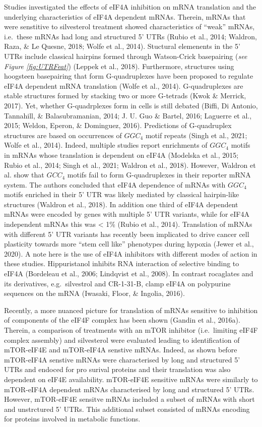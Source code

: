 \documentclass[12pt,openany]{book}
\begin{document}
Studies investigated the effects of eIF4A inhibition on mRNA translation
and the underlying characteristics of eIF4A dependent mRNAs. Therein,
mRNAs that were senstitive to silvesterol treatment showed
characteristics of ``weak'' mRNAs, i.e.~these mRNAs had long and
structured 5' UTRs (Rubio et al., 2014; Waldron, Raza, \& Le Quesne,
2018; Wolfe et al., 2014). Stuctural elemenents in the 5' UTRs include
classical hairpins formed through Watson-Crick basepairing (\emph{see
Figure \ref{fig:UTRFeat}}) (Leppek et al., 2018). Furthermore,
structures using hoogsteen basepairing that form G-quadruplexes have
been proposed to regulate eIF4A dependent mRNA translation (Wolfe et
al., 2014). G-quadruplexes are stable structures formed by stacking two
or more G-tetrads (Kwok \& Merrick, 2017). Yet, whether G-quadrplexes
form in cells is still debated (Biffi, Di Antonio, Tannahill, \&
Balasubramanian, 2014; J. U. Guo \& Bartel, 2016; Laguerre et al., 2015;
Weldon, Eperon, \& Dominguez, 2016). Predictions of G-quadruplex
structures are based on occurrences of \(GGC_4\) motif repeats (Singh et
al., 2021; Wolfe et al., 2014). Indeed, multiple studies report
enrichments of \(GGC_4\) motifs in mRNAs whose translation is dependent
on eIF4A (Modelska et al., 2015; Rubio et al., 2014; Singh et al., 2021;
Waldron et al., 2018). However, Waldron et al. show that \(GCC_4\)
motifs fail to form G-quadruplexes in their reporter mRNA system. The
authors concluded that eIF4A dependence of mRNAs with \(GGC_4\) motifs
enriched in their 5' UTR was likely mediated by classical hairpin-like
structures (Waldron et al., 2018). In addition one third of eIF4A
dependent mRNAs were encoded by genes with multiple 5' UTR variants,
while for eIF4A independent mRNAs this was \textless{} 1\% (Rubio et
al., 2014). Translation of mRNAs with different 5' UTR variants has
recently been implicated to drive cancer cell plasticity towards more
``stem cell like'' phenotypes during hypoxia (Jewer et al., 2020). A
note here is the use of eIF4A inhibitors with different modes of action
in these studies. Hippuristanol inhibits RNA interaction of selective
binding to eIF4A (Bordeleau et al., 2006; Lindqvist et al., 2008). In
contrast rocaglates and its derivatives, e.g.~silvestrol and CR-1-31-B,
clamp eIF4A on polypurine sequences on the mRNA (Iwasaki, Floor, \&
Ingolia, 2016).

Recently, a more nuanced picture for translation of mRNAs sensitive to
inhibition of components of the eIF4F complex has been shown (Gandin et
al., 2016a). Therein, a comparison of treatments with an mTOR inhibitor
(i.e.~limiting eIF4F complex assembly) and silvesterol were evaluated
leading to identification of mTOR-eIF4E and mTOR-eIF4A senstive mRNAs.
Indeed, as shown before mTOR-eIF4A senstive mRNAs were characterised by
long and structured 5' UTRs and endoced for pro surival proteins and
their translation was also dependent on eIF4E availability. mTOR-eIF4E
sensitive mRNAs were similarly to mTOR-eIF4A dependent mRNAs
characterised by long and structured 5' UTRs. However, mTOR-eIF4E
sensitve mRNAs included a subset of mRNAs with short and unstrctured 5'
UTRs. This additional subset consisted of mRNAs encoding for proteins
involved in metabolic functions.
\end{document}
